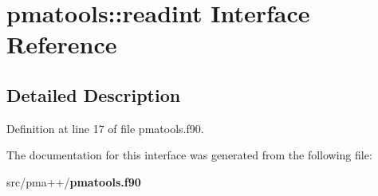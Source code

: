 \section{pmatools\+:\+:readint Interface Reference}
\label{interfacepmatools_1_1readint}


\subsection{Detailed Description}


Definition at line 17 of file pmatools.\+f90.



The documentation for this interface was generated from the following file\+:\begin{DoxyCompactItemize}
\item 
src/pma++/{\bf pmatools.\+f90}\end{DoxyCompactItemize}
